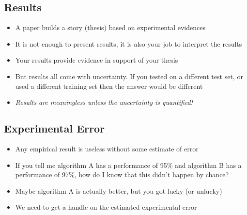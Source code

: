 
\begin{slide}
\section{Results}

\begin{PauseHighLight}
  \begin{itemize}
  \item A paper builds a story (thesis) based on experimental
    evidences\pause
  \item It is not enough to present results, it is also your job to
    interpret the results\pause
  \item Your results provide evidence in support of your thesis\pause
  \item But results all come with uncertainty.  If you tested on a
    different test set, or used a different training set then the
    answer would be different\pause
  \item \emph{Results are meaningless unless the uncertainty is quantified!}\pause
  \end{itemize}
\end{PauseHighLight}

\end{slide}

\Outline %

\begin{slide}
\section{Experimental Error}

\begin{PauseHighLight}
  \begin{itemize}
  \item Any empirical result is useless without some estimate of
    error\pause
  \item If you tell me algorithm A has a performance of 95\% and
    algorithm B has a performance of 97\%, how do I know that this
    didn't happen by chance?\pause
  \item Maybe algorithm A is actually better, but you got lucky (or
    unlucky)\pause
  \item We need to get a handle on the estimated experimental error\pause
  \end{itemize}
\end{PauseHighLight}

\end{slide}

